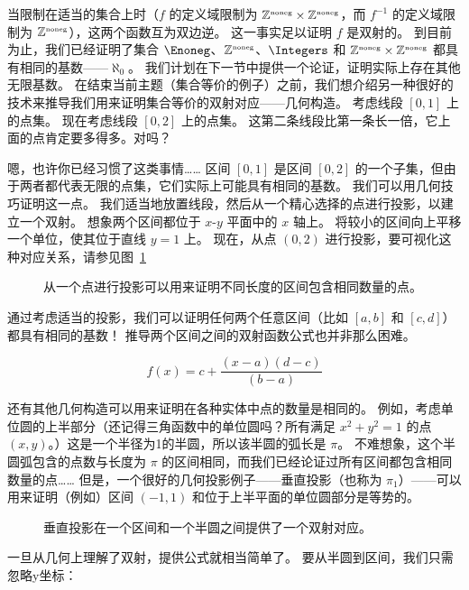 当限制在适当的集合上时（$f$ 的定义域限制为 ${\mathbb Z}^{\mbox{\tiny noneg}} \times {\mathbb Z}^{\mbox{\tiny noneg}}$，而 $f^{-1}$ 的定义域限制为 ${\mathbb Z}^{\mbox{\tiny noneg}}$），这两个函数互为双边逆。
这一事实足以证明 $f$ 是双射的。
到目前为止，我们已经证明了集合 $\Enoneg$、${\mathbb Z}^{\mbox{\tiny noneg}}$、$\Integers$ 和 ${\mathbb Z}^{\mbox{\tiny noneg}} \times {\mathbb Z}^{\mbox{\tiny noneg}}$ 都具有相同的基数——$\aleph_0$。
我们计划在下一节中提供一个论证，证明实际上存在其他无限基数。
在结束当前主题（集合等价的例子）之前，我们想介绍另一种很好的技术来推导我们用来证明集合等价的双射对应——几何构造。
考虑线段 $[0, 1]$ 上的点集。
现在考虑线段 $[0, 2]$ 上的点集。
这第二条线段比第一条长一倍，它上面的点肯定要多得多。对吗？

嗯，也许你已经习惯了这类事情…… 区间 $[0, 1]$ 是区间 $[0, 2]$ 的一个子集，但由于两者都代表无限的点集，它们实际上可能具有相同的基数。
我们可以用几何技巧证明这一点。
我们适当地放置线段，然后从一个精心选择的点进行投影，以建立一个双射。
想象两个区间都位于 $x$-$y$ 平面中的 $x$ 轴上。
将较小的区间向上平移一个单位，使其位于直线 $y = 1$ 上。
现在，从点 $(0, 2)$ 进行投影，要可视化这种对应关系，请参见图~\ref{fig:equiv_intervals}

\begin{figure}[!hbtp]
    
    \caption[等价区间。]{从一个点进行投影可以用来证明不同长度的区间包含相同数量的点。}
    \label{fig:equiv_intervals}
\end{figure}

通过考虑适当的投影，我们可以证明任何两个任意区间（比如 $[a, b]$ 和 $[c, d]$）都具有相同的基数！
推导两个区间之间的双射函数公式也并非那么困难。

\[ f(x) = c + \frac{(x - a)(d - c)}{(b - a)} \]

还有其他几何构造可以用来证明在各种实体中点的数量是相同的。
例如，考虑单位圆的上半部分（还记得三角函数中的单位圆吗？所有满足 $x^2 + y^2 = 1$ 的点 $(x, y)$。）这是一个半径为1的半圆，所以该半圆的弧长是 $\pi$。
不难想象，这个半圆弧包含的点数与长度为 $\pi$ 的区间相同，而我们已经论证过所有区间都包含相同数量的点…… 但是，一个很好的几何投影例子——垂直投影（也称为 $\pi_1$）——可以用来证明（例如）区间 $(-1, 1)$ 和位于上半平面的单位圆部分是等势的。

\begin{figure}[!hbtp]
    
    \caption[一个区间等价于一个半圆。]{垂直投影在一个区间和一个半圆之间提供了一个双射对应。
    }
    \label{fig:interval_n_semicircle}
\end{figure}

一旦从几何上理解了双射，提供公式就相当简单了。
要从半圆到区间，我们只需忽略y坐标：

